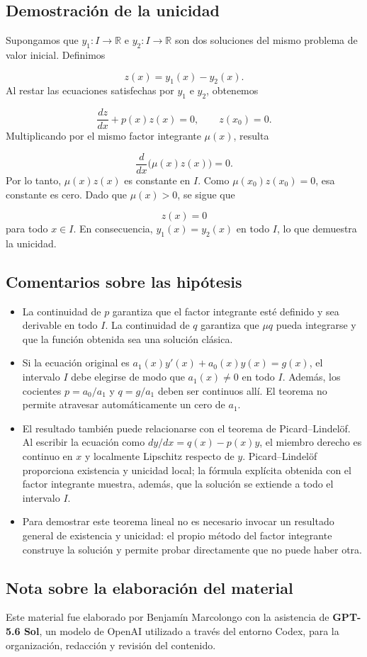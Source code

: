\documentclass[12pt,a4paper]{article}
\begin{document}
	\subsection{Demostración de la unicidad}

	Supongamos que \(y_1:I\to\mathbb{R}\) e \(y_2:I\to\mathbb{R}\) son dos soluciones del mismo problema de valor inicial. Definimos

	\[
	z(x)=y_1(x)-y_2(x).
	\]
	Al restar las ecuaciones satisfechas por \(y_1\) e \(y_2\), obtenemos

	\[
	\frac{dz}{dx}+p(x)z(x)=0,
	\qquad
	z(x_0)=0.
	\]
	Multiplicando por el mismo factor integrante \(\mu(x)\), resulta

	\[
	\frac{d}{dx}\bigl(\mu(x)z(x)\bigr)=0.
	\]
	Por lo tanto, \(\mu(x)z(x)\) es constante en \(I\). Como \(\mu(x_0)z(x_0)=0\), esa constante es cero. Dado que \(\mu(x)>0\), se sigue que

	\[
	z(x)=0
	\]
	para todo \(x\in I\). En consecuencia, \(y_1(x)=y_2(x)\) en todo \(I\), lo que demuestra la unicidad.

	\subsection{Comentarios sobre las hipótesis}

	\begin{itemize}[leftmargin=*]
		\item La continuidad de \(p\) garantiza que el factor integrante esté definido y sea derivable en todo \(I\). La continuidad de \(q\) garantiza que \(\mu q\) pueda integrarse y que la función obtenida sea una solución clásica.
		\item Si la ecuación original es \(a_1(x)y'(x)+a_0(x)y(x)=g(x)\), el intervalo \(I\) debe elegirse de modo que \(a_1(x)\neq0\) en todo \(I\). Además, los cocientes \(p=a_0/a_1\) y \(q=g/a_1\) deben ser continuos allí. El teorema no permite atravesar automáticamente un cero de \(a_1\).
		\item El resultado también puede relacionarse con el teorema de Picard--Lindelöf. Al escribir la ecuación como \(dy/dx=q(x)-p(x)y\), el miembro derecho es continuo en \(x\) y localmente Lipschitz respecto de \(y\). Picard--Lindelöf proporciona existencia y unicidad local; la fórmula explícita obtenida con el factor integrante muestra, además, que la solución se extiende a todo el intervalo \(I\).
		\item Para demostrar este teorema lineal no es necesario invocar un resultado general de existencia y unicidad: el propio método del factor integrante construye la solución y permite probar directamente que no puede haber otra.
	\end{itemize}

	\subsection*{Nota sobre la elaboración del material}

	Este material fue elaborado por Benjamín Marcolongo con la asistencia de \textbf{GPT-5.6 Sol}, un modelo de OpenAI utilizado a través del entorno Codex, para la organización, redacción y revisión del contenido.
\end{document}

